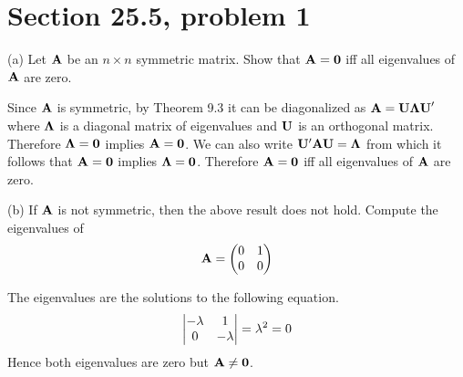 \section{Section 25.5, problem 1}
(a) Let $\bf A$ be an $n\times n$ symmetric matrix.
Show that ${\bf A}={\bf 0}$ iff all eigenvalues of $\bf A$ are zero.

\bigskip
\noindent
Since $\bf A$ is symmetric, by Theorem 9.3 it can be diagonalized
as ${\bf A}={\bf U\Lambda U}'$ where $\bf\Lambda$ is a diagonal
matrix of eigenvalues and $\bf U$ is an orthogonal matrix.
Therefore ${\bf\Lambda}=\bf0$ implies ${\bf A}=\bf0$.
We can also write ${\bf U}'{\bf AU}=\bf\Lambda$ from which it follows
that ${\bf A}=\bf0$ implies ${\bf\Lambda=0}$.
Therefore ${\bf A}={\bf 0}$ iff all eigenvalues of $\bf A$ are zero.

\bigskip
\noindent
(b) If $\bf A$ is not symmetric, then the above result does not hold.
Compute the eigenvalues of
$${\bf A}=\left(\begin{matrix}
0 & 1\cr
0 & 0
\end{matrix}\right)
$$

\bigskip
\noindent
The eigenvalues are the solutions to the following equation.
$$\left|\begin{matrix}
-\lambda & 1\cr
0 & -\lambda
\end{matrix}\right|=\lambda^2=0
$$
Hence both eigenvalues are zero but ${\bf A}\ne\bf 0$.
